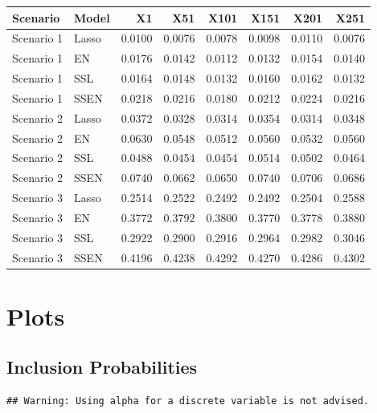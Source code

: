 \documentclass[
]{article}
\begin{document}
\begin{longtable}[]{@{}llrrrrrr@{}}
\toprule
Scenario & Model & X1 & X51 & X101 & X151 & X201 & X251 \\
\midrule
\endhead
Scenario 1 & Lasso & 0.0100 & 0.0076 & 0.0078 & 0.0098 & 0.0110 &
0.0076 \\
Scenario 1 & EN & 0.0176 & 0.0142 & 0.0112 & 0.0132 & 0.0154 & 0.0140 \\
Scenario 1 & SSL & 0.0164 & 0.0148 & 0.0132 & 0.0160 & 0.0162 &
0.0132 \\
Scenario 1 & SSEN & 0.0218 & 0.0216 & 0.0180 & 0.0212 & 0.0224 &
0.0216 \\
Scenario 2 & Lasso & 0.0372 & 0.0328 & 0.0314 & 0.0354 & 0.0314 &
0.0348 \\
Scenario 2 & EN & 0.0630 & 0.0548 & 0.0512 & 0.0560 & 0.0532 & 0.0560 \\
Scenario 2 & SSL & 0.0488 & 0.0454 & 0.0454 & 0.0514 & 0.0502 &
0.0464 \\
Scenario 2 & SSEN & 0.0740 & 0.0662 & 0.0650 & 0.0740 & 0.0706 &
0.0686 \\
Scenario 3 & Lasso & 0.2514 & 0.2522 & 0.2492 & 0.2492 & 0.2504 &
0.2588 \\
Scenario 3 & EN & 0.3772 & 0.3792 & 0.3800 & 0.3770 & 0.3778 & 0.3880 \\
Scenario 3 & SSL & 0.2922 & 0.2900 & 0.2916 & 0.2964 & 0.2982 &
0.3046 \\
Scenario 3 & SSEN & 0.4196 & 0.4238 & 0.4292 & 0.4270 & 0.4286 &
0.4302 \\
\bottomrule
\end{longtable}

\hypertarget{plots}{%
\section{Plots}\label{plots}}

\hypertarget{inclusion-probabilities}{%
\subsection{Inclusion Probabilities}\label{inclusion-probabilities}}

\begin{verbatim}
## Warning: Using alpha for a discrete variable is not advised.
\end{verbatim}
\end{document}
